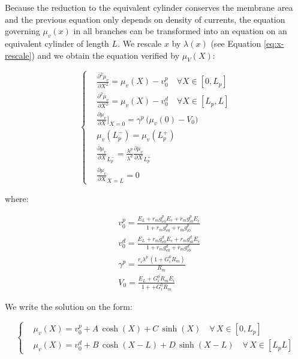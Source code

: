 \documentclass[colorlinks]{article}
\begin{document}
Because the reduction to the equivalent cylinder conserves the
membrane area and the previous equation only depends on density of
currents, the equation governing $\mu_v(x)$ in all branches can be
transformed into an equation on an equivalent cylinder of length $L$.
We rescale $x$ by $\lambda(x)$ (see Equation \ref{eq:x-rescale}) and we
obtain the equation verified by \(\mu_V(X)\):

\begin{equation}
\label{eq:model-equation-muV-rescaled}
\left\{
\begin{split}
& \frac{\partial^2 \mu_v}{\partial X^2} = \mu_v(X)-v_0^p \quad \forall X \in [0,L_p] \\
&\frac{\partial^2 \mu_v}{\partial X^2} = \mu_v(X)-v_0^d \quad \forall X \in [L_p,L]  \\
&\frac{\partial \mu_v}{\partial X}|_{X=0} = \gamma^p \, 
\Big( \mu_v(0) - V_0  \Big) \\
&\mu_v(L_p^-) = \mu_v(L_p^+) \\
&\frac{\partial \mu_v}{\partial X}_{L_p^-} = \frac{\lambda^p}{\lambda^d}
\frac{\partial \mu_v}{\partial X}_{L_p^+} \\
&\frac{\partial \mu_v}{\partial X}_{X=L} = 0 
\end{split}
\right.
\end{equation}

where:

\begin{equation}
\begin{split}
& v_0^p = \frac{E_L + r_m g_{e0}^p E_e + r_m g_{i0}^p E_i}{ 1 + r_m g_{e0}^p + r_m g_{i0}^p }\\
& v_0^d = \frac{E_L + r_m g_{e0}^d E_e + r_m g_{i0}^d E_i}{ 1 + r_m g_{e0}^d + r_m g_{i0}^d }\\
& \gamma^p = \frac{r_i \lambda^p \, (1+ G_i^0 R_m)}{R_m}\\
& V_0 = \frac{E_L + G_i^0 R_m E_i}{ 1 +  + G_i^0 R_m }
\end{split}
\end{equation}

We write the solution on the form:

\begin{equation}
\left\{
\begin{split}
& \mu_v(X) = v_0^p + A \, \cosh(X) + C \, \sinh(X) \quad \forall \, X \in [0,L_p] \\
& \mu_v(X) = v_0^d + B \, \cosh(X-L) + D \, \sinh(X-L) \quad \forall \, X \in [L_pL]
\end{split}
\right.
\end{equation}
\end{document}
